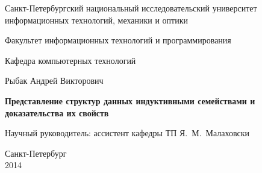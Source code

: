\documentclass[a4paper]{report}
\begin{document}
\initializefrontsections

\pagestyle{title}

\begin{center}
Санкт-Петербургский национальный исследовательский университет \\ информационных технологий, механики и оптики

\vspace{2cm}

Факультет информационных технологий и программирования

Кафедра компьютерных технологий

\vspace{3cm}

{\Large Рыбак Андрей Викторович}

\vspace{2cm}

\vbox{\LARGE\bfseries
Представление структур данных индуктивными семействами и доказательства их свойств
}

\vspace{4cm}

{\Large Научный руководитель: ассистент кафедры ТП Я.~М.~Малаховски}

\vspace{6cm}

Санкт-Петербург\\ 2014
\end{center}

\newpage

\setcounter{page}{3}
\pagestyle{plain}

\tableofcontents

\startthechapters


% 
% 
% 

\printbibliography

% 
\end{document}
